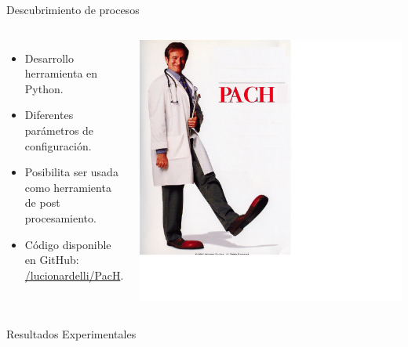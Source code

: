 \documentclass[spanish,pdf]{beamer}
\begin{document}
\begin{frame}[fragile]{Descubrimiento de procesos}{\pachtool}
  \begin{columns}
        \begin{itemize}
          \setlength\itemsep{0.2cm}
          \item Desarrollo herramienta \pachtool en Python.
          \item Diferentes parámetros de configuración.
          \item Posibilita ser usada como herramienta de post procesamiento.
          \item Código disponible en GitHub: \url{/lucionardelli/PacH}.
        \end{itemize}
        \centering
        \includegraphics[width=1.9\linewidth]{img/pach.png}
  \end{columns}
\end{frame}

\begin{frame}[fragile]{\pachtool}{Resultados Experimentales}
  \scriptsize
  
\end{frame}

%  
\end{document}
